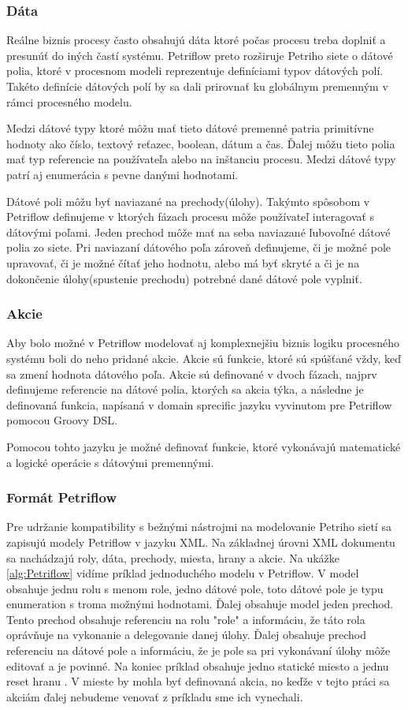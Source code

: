 \subsubsection{Dáta}
Reálne biznis procesy často obsahujú dáta ktoré  počas procesu treba doplniť a presunúť do iných častí systému. Petriflow preto rozširuje Petriho siete o dátové polia, ktoré v procesnom modeli reprezentuje definíciami typov dátových polí. Takéto definície dátových polí by sa dali prirovnať ku globálnym premenným v rámci procesného modelu.  

Medzi dátové typy ktoré môžu  mať tieto dátové premenné patria primitívne hodnoty ako číslo, textový reťazec, boolean, dátum a čas. Ďalej môžu tieto polia mať typ referencie na používateľa alebo na inštanciu procesu. Medzi dátové typy patrí aj enumerácia s pevne danými hodnotami.

Dátové poli môžu byť naviazané na prechody(úlohy). Takýmto spôsobom v Petriflow definujeme v ktorých fázach procesu môže používateľ interagovať s dátovými poľami. Jeden prechod môže mať na seba naviazané ľubovoľné dátové polia zo siete. Pri naviazaní dátového poľa zároveň definujeme, či je možné pole upravovať, či je možné čítať jeho hodnotu, alebo má byť skryté a či je na dokončenie úlohy(spustenie prechodu) potrebné dané dátové pole vyplniť.  

\subsubsection{Akcie}
Aby bolo možné v Petriflow modelovať aj komplexnejšiu biznis logiku procesného systému boli do neho pridané akcie. Akcie sú funkcie, ktoré sú spúšťané vždy, keď sa zmení hodnota dátového poľa. Akcie sú definované v dvoch fázach, najprv definujeme referencie na dátové polia, ktorých sa akcia týka, a následne je definovaná funkcia, napísaná v domain sprecific jazyku vyvinutom pre Petriflow pomocou Groovy DSL. 

Pomocou tohto jazyku je možné definovať funkcie, ktoré vykonávajú matematické a logické operácie s dátovými premennými. 

\subsubsection{Formát Petriflow}
Pre udržanie kompatibility s bežnými nástrojmi na modelovanie Petriho sietí sa zapisujú modely Petriflow v jazyku XML. Na základnej úrovni XML dokumentu sa nachádzajú roly, dáta, prechody, miesta, hrany a akcie. Na ukážke \ref{alg:Petriflow} vidíme príklad jednoduchého modelu v Petriflow. 
V model obsahuje jednu rolu s menom role, 
jedno dátové pole, toto dátové pole je typu enumeration s troma možnými hodnotami. 
Ďalej obsahuje model jeden prechod. Tento prechod obsahuje referenciu na rolu "role" a informáciu, že táto rola oprávňuje na vykonanie a delegovanie danej úlohy. Ďalej obsahuje prechod referenciu na dátové pole a informáciu, že je pole sa pri vykonávaní úlohy môže editovať a je povinné.
Na koniec príklad obsahuje jedno statické miesto a jednu reset hranu . V mieste by mohla byť definovaná akcia, no keďže v tejto práci sa akciám ďalej nebudeme venovať z príkladu sme ich vynechali.

